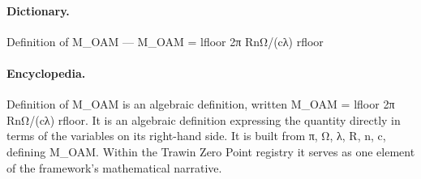 \paragraph{Dictionary.}
Definition of M\_OAM — M\_OAM = lfloor 2π RnΩ/(cλ) rfloor

\paragraph{Encyclopedia.}
Definition of M\_OAM is an algebraic definition, written M\_OAM = lfloor 2π RnΩ/(cλ) rfloor. It is an algebraic definition expressing the quantity directly in terms of the variables on its right-hand side. It is built from π, Ω, λ, R, n, c, defining M\_OAM. Within the Trawin Zero Point registry it serves as one element of the framework's mathematical narrative.
